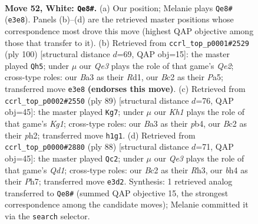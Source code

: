 \documentclass[11pt]{article}
\begin{document}
\clearpage

\begin{figure}[p]\centering
\begin{subfigure}{0.46\textwidth}\centering
\resizebox{\linewidth}{!}{%
\newchessgame
\chessboard[
  setfen={qrb3k1/p1p2pp1/1p6/7p/1P3P1b/B3Q2P/P1B3P1/7K w - - 0 52},
  showmover=false,
  pgfstyle=straightmove, color=movearrow, markmove={e3-e8}
]}
\caption{}
\end{subfigure}\hfill
\begin{subfigure}{0.46\textwidth}\centering
\resizebox{\linewidth}{!}{%
\newchessgame
\chessboard[
  setfen={8/6kp/pB6/Pp2p3/2p1qr1b/2P4P/4Q1P1/3R3K w - - 0 51},
  showmover=false,
  pgfstyle=straightmove, color=movearrow, markmove={e2-h5}
]}
\caption{}
\end{subfigure}
\\[4pt]
\begin{subfigure}{0.46\textwidth}\centering
\resizebox{\linewidth}{!}{%
\newchessgame
\chessboard[
  setfen={b3r1k1/8/P1p2qp1/3pp3/1P4P1/2QB1P2/7P/5RK1 b - - 1 45},
  showmover=false,
  pgfstyle=straightmove, color=movearrow, markmove={g8-g7}
]}
\caption{}
\end{subfigure}\hfill
\begin{subfigure}{0.46\textwidth}\centering
\resizebox{\linewidth}{!}{%
\newchessgame
\chessboard[
  setfen={1r6/4kp1P/1q2pb2/5p2/p3pP2/P1P4R/KP2B3/3Q4 w - - 6 45},
  showmover=false,
  pgfstyle=straightmove, color=movearrow, markmove={d1-c2}
]}
\caption{}
\end{subfigure}
\caption{\textbf{Move 52, White: \texttt{Qe8\#}.} (a) Our position; Melanie plays \texttt{Qe8\#} (\texttt{e3e8}). Panels (b)--(d) are the retrieved master positions whose correspondence most drove this move (highest QAP objective among those that transfer to it). (b) Retrieved from \texttt{ccrl\_top\_p0001\#2529} (ply 100) [structural distance $d$=69, QAP obj=15]: the master played \texttt{Qh5}; under $\mu$ our \emph{Qe3} plays the role of that game's \emph{Qe2}; cross-type roles: our \emph{B}a3 as their \emph{R}d1, our \emph{B}c2 as their \emph{P}a5; transferred move \texttt{e3e8} \textbf{(endorses this move)}. (c) Retrieved from \texttt{ccrl\_top\_p0002\#2550} (ply 89) [structural distance $d$=76, QAP obj=45]: the master played \texttt{Kg7}; under $\mu$ our \emph{Kh1} plays the role of that game's \emph{Kg1}; cross-type roles: our \emph{B}a3 as their \emph{p}b4, our \emph{B}c2 as their \emph{p}h2; transferred move \texttt{h1g1}. (d) Retrieved from \texttt{ccrl\_top\_p0000\#2880} (ply 88) [structural distance $d$=71, QAP obj=45]: the master played \texttt{Qc2}; under $\mu$ our \emph{Qe3} plays the role of that game's \emph{Qd1}; cross-type roles: our \emph{B}c2 as their \emph{R}h3, our \emph{b}h4 as their \emph{P}h7; transferred move \texttt{e3d2}. Synthesis: 1 retrieved analog transferred to \texttt{Qe8\#} (summed QAP objective 15, the strongest correspondence among the candidate moves); Melanie committed it via the \texttt{search} selector.}
\label{fig:thought-m102}
\end{figure}
\end{document}
